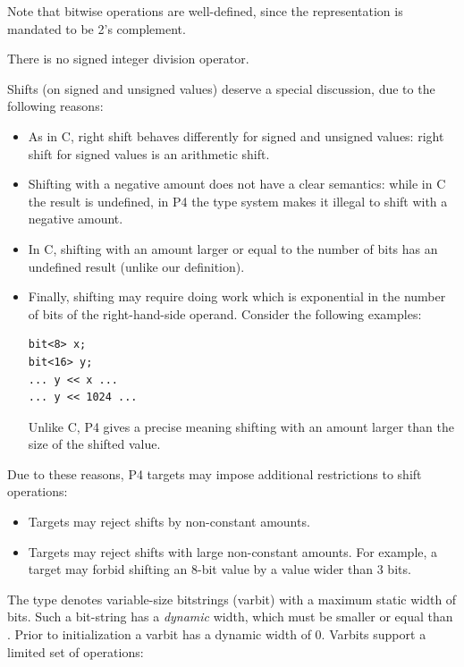 \documentclass[12pt]{article}
\begin{document}
Note that bitwise operations are well-defined, since the
representation is mandated to be 2's complement.

There is no signed integer division operator.


Shifts (on signed and unsigned values) deserve a special discussion,
due to the following reasons:

\begin{itemize}
  \item As in C, right shift behaves differently for signed and
    unsigned values: right shift for signed values is an arithmetic
    shift.
  \item Shifting with a negative amount does not have a clear
    semantics: while in C the result is undefined, in P4 the type
    system makes it illegal to shift with a negative amount.
  \item In C, shifting with an amount larger or equal to the number of
    bits has an undefined result (unlike our definition).
  \item Finally, shifting may require doing work which is exponential
    in the number of bits of the right-hand-side operand.  Consider
    the following examples:

\begin{lstlisting}[style=P4style]
bit<8> x;
bit<16> y;
... y << x ...
... y << 1024 ...
\end{lstlisting}
    
    Unlike C, P4 gives a precise meaning shifting with an amount
    larger than the size of the shifted value.
\end{itemize}

Due to these reasons, P4 targets may impose additional restrictions to
shift operations:

\begin{itemize}
\item Targets may reject shifts by non-constant amounts.
\item Targets may reject shifts with large non-constant amounts.  For
  example, a target may forbid shifting an 8-bit value by a value
  wider than 3 bits.
\end{itemize}


The type  denotes variable-size bitstrings (varbit)
with a maximum static width of \W{} bits.  Such a bit-string has a
\emph{dynamic} width, which must be smaller or equal than \W.  Prior
to initialization a varbit has a dynamic width of 0.  Varbits support
a limited set of operations:
\end{document}
